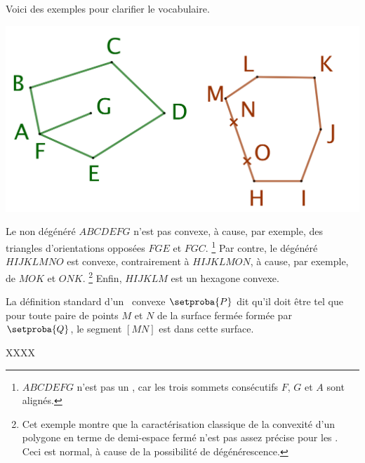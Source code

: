\begin{remark}
    Voici des exemples pour clarifier le vocabulaire.	
    
    \begin{center}
    	\includegraphics[scale=.3]{content/polygon/convex/degenerated-ncycles.png}
    \end{center}
    
    Le  non dégénéré $ABCDEFG$ n'est pas convexe, à cause, par exemple, des triangles d'orientations opposées $FGE$ et $FGC$.%
    \footnote{
        $ABCDEFG$ n'est pas un , car les trois sommets consécutifs $F$, $G$ et $A$ sont alignés.
    }
    Par contre,
    le  dégénéré $HIJKLMNO$ est convexe, contrairement à $HIJKLMON$, à cause, par exemple, de $MOK$ et $ONK$.%
    \footnote{
         Cet exemple montre que la caractérisation classique de la convexité d'un polygone en terme de demi-espace fermé n'est pas assez précise pour les \ncycles. Ceci est normal, à cause de la possibilité de dégénérescence.
    }
    Enfin,
    $HIJKLM$ est un hexagone convexe.
\end{remark}




\begin{remark}
    La définition standard d'un \ngone\ convexe $\setproba{P}$ dit qu'il doit être tel que pour toute paire de points $M$ et $N$ de la surface fermée  formée par $\setproba{Q}$, le segment $[MN]$ est dans cette surface.
    
    XXXX
\end{remark}




